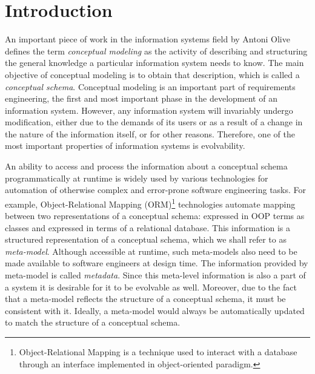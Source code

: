 \chapter{Introduction}\label{chap:intro}

An important piece of work in the information systems field by Antoni Olive \cite{CMofIS} defines the term \textit{conceptual modeling} as the activity of describing and structuring the general knowledge a particular information system needs to know.
The main objective of conceptual modeling is to obtain that description, which is called a \textit{conceptual schema}.
Conceptual modeling is an important part of requirements engineering, the first and most important phase in the development of an information system.
However, any information system will invariably undergo modification, either due to the demands of its users or as a result of a change in the nature of the information itself, or for other reasons.
Therefore, one of the most important properties of information systems is evolvability.

\n

An ability to access and process the information about a conceptual schema programmatically at runtime is widely used by various technologies for automation of otherwise complex and error-prone software engineering tasks.
For example, Object-Relational Mapping (ORM)\footnote{Object-Relational Mapping is a technique used to interact with a database through an interface implemented in object-oriented paradigm.} technologies automate mapping between two representations of a conceptual schema: expressed in OOP terms as classes and expressed in terms of a relational database.
This information is a structured representation of a conceptual schema, which we shall refer to as \textit{meta-model}.
Although accessible at runtime, such meta-models also need to be made available to software engineers at design time.
The information provided by meta-model is called \textit{metadata}.
Since this meta-level information is also a part of a system it is desirable for it to be evolvable as well.
Moreover, due to the fact that a meta-model reflects the structure of a conceptual schema, it must be consistent with it.
Ideally, a meta-model would always be automatically updated to match the structure of a conceptual schema.

\n

